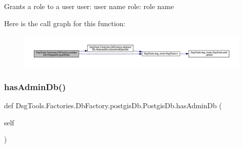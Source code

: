 \begin{DoxyVerb}Grants a role to a user
user: user name
role: role name
\end{DoxyVerb}
 Here is the call graph for this function\+:
\nopagebreak
\begin{figure}[H]
\begin{center}
\leavevmode
\includegraphics[width=350pt]{class_dsg_tools_1_1_factories_1_1_db_factory_1_1postgis_db_1_1_postgis_db_a778122593c41cc689833ffe458b92477_cgraph}
\end{center}
\end{figure}
\mbox{\label{class_dsg_tools_1_1_factories_1_1_db_factory_1_1postgis_db_1_1_postgis_db_a30b0ce8ef3ba4e2d9c712a419d99d659}} 
\subsubsection{\texorpdfstring{has\+Admin\+Db()}{hasAdminDb()}}
{\footnotesize\ttfamily def Dsg\+Tools.\+Factories.\+Db\+Factory.\+postgis\+Db.\+Postgis\+Db.\+has\+Admin\+Db (\begin{DoxyParamCaption}\item[{}]{self }\end{DoxyParamCaption})}

